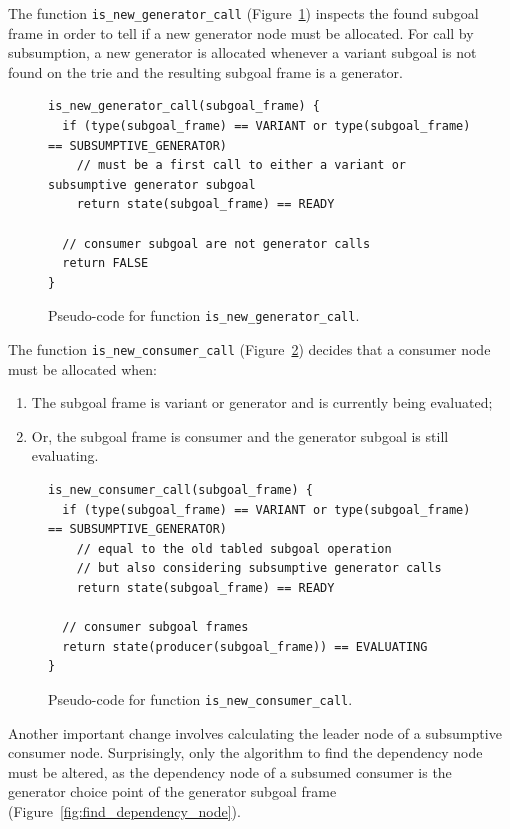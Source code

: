 The function \texttt{is\_new\_generator\_call} (Figure~\ref{fig:is_new_generator_call}) inspects the found
subgoal frame in order to tell if a new generator node must be allocated.
For call by subsumption, a new generator is allocated whenever a variant subgoal is not found
on the trie and the resulting subgoal frame is a generator.

\begin{figure}[ht]
\begin{Verbatim}
is_new_generator_call(subgoal_frame) {
  if (type(subgoal_frame) == VARIANT or type(subgoal_frame) == SUBSUMPTIVE_GENERATOR)
    // must be a first call to either a variant or subsumptive generator subgoal
    return state(subgoal_frame) == READY
    
  // consumer subgoal are not generator calls
  return FALSE
}
\end{Verbatim}
\caption{Pseudo-code for function \texttt{is\_new\_generator\_call}.}
\label{fig:is_new_generator_call}
\end{figure}

The function \texttt{is\_new\_consumer\_call} (Figure~\ref{fig:is_new_consumer_call}) decides
that a consumer node must be allocated when:

\begin{enumerate}
  \item The subgoal frame is variant or generator and is currently being evaluated;
  \item Or, the subgoal frame is consumer and the generator subgoal is still evaluating.
\end{enumerate}

\begin{figure}[ht]
\begin{Verbatim}
is_new_consumer_call(subgoal_frame) {
  if (type(subgoal_frame) == VARIANT or type(subgoal_frame) == SUBSUMPTIVE_GENERATOR)
    // equal to the old tabled subgoal operation
    // but also considering subsumptive generator calls
    return state(subgoal_frame) == READY
  
  // consumer subgoal frames
  return state(producer(subgoal_frame)) == EVALUATING
}
\end{Verbatim}
\caption{Pseudo-code for function \texttt{is\_new\_consumer\_call}.}
\label{fig:is_new_consumer_call}
\end{figure}

Another important change involves calculating the leader node of a subsumptive consumer node.
Surprisingly, only the algorithm to find the dependency node must be altered, as
the dependency node of a subsumed consumer is the generator choice point of
the generator subgoal frame (Figure~\ref{fig:find_dependency_node}).  

